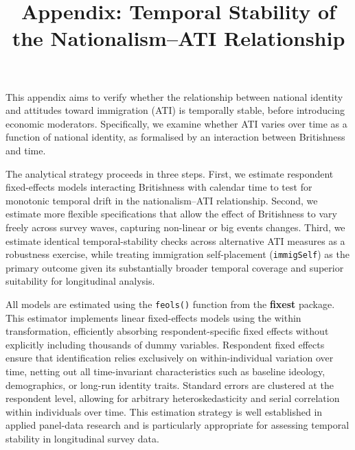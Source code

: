 \documentclass[
  11pt,
  letterpaper,
  DIV=11,
  numbers=noendperiod]{scrartcl}
\title{Appendix: Temporal Stability of the Nationalism--ATI
Relationship}
\author{}
\date{}
\begin{document}
\maketitle


This appendix aims to verify whether the relationship between national
identity and attitudes toward immigration (ATI) is temporally stable,
before introducing economic moderators. Specifically, we examine whether
ATI varies over time as a function of national identity, as formalised
by an interaction between Britishness and time.

The analytical strategy proceeds in three steps. First, we estimate
respondent fixed-effects models interacting Britishness with calendar
time to test for monotonic temporal drift in the nationalism--ATI
relationship. Second, we estimate more flexible specifications that
allow the effect of Britishness to vary freely across survey waves,
capturing non-linear or big events changes. Third, we estimate identical
temporal-stability checks across alternative ATI measures as a
robustness exercise, while treating immigration self-placement
(\texttt{immigSelf}) as the primary outcome given its substantially
broader temporal coverage and superior suitability for longitudinal
analysis.

All models are estimated using the \texttt{feols()} function from the
\textbf{fixest} package. This estimator implements linear fixed-effects
models using the within transformation, efficiently absorbing
respondent-specific fixed effects without explicitly including thousands
of dummy variables. Respondent fixed effects ensure that identification
relies exclusively on within-individual variation over time, netting out
all time-invariant characteristics such as baseline ideology,
demographics, or long-run identity traits. Standard errors are clustered
at the respondent level, allowing for arbitrary heteroskedasticity and
serial correlation within individuals over time. This estimation
strategy is well established in applied panel-data research and is
particularly appropriate for assessing temporal stability in
longitudinal survey data.
\end{document}
